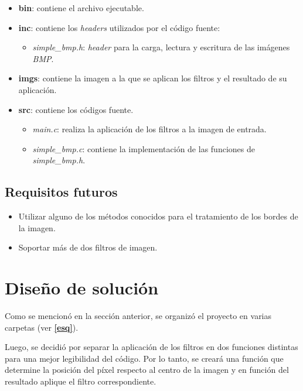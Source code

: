 \documentclass[12pt,a4paper]{article}
\begin{document}
\begin{itemize}[leftmargin=1.5cm]
  \item \textbf{bin}: contiene el archivo ejecutable.
  \item \textbf{inc}: contiene los \emph{headers} utilizados por el
  código fuente:

  \begin{itemize}[leftmargin=1cm, nosep]
    \item \emph{simple\_bmp.h}: \emph{header} para la carga, lectura y
    escritura de las imágenes \emph{BMP}.
  \end{itemize}

  \item \textbf{imgs}: contiene la imagen a la que se aplican los filtros y
  el resultado de su aplicación.
  \item \textbf{src}: contiene los códigos fuente.

  \begin{itemize}[leftmargin=1cm, nosep]
    \item \emph{main.c}: realiza la aplicación de los filtros a la imagen de
    entrada.
    \item \emph{simple\_bmp.c}: contiene la implementación de las funciones de
    \emph{simple\_bmp.h}.
  \end{itemize}
\end{itemize}

\subsection{Requisitos futuros}
\label{futurereq}

\begin{itemize}[leftmargin=1.5cm]
  \item Utilizar alguno de los métodos conocidos para el tratamiento de los
  bordes de la imagen.
  \item Soportar más de dos filtros de imagen.
\end{itemize}


\section{Diseño de solución}
\label{solucion}
Como se mencionó en la sección anterior, se organizó el proyecto en varias
carpetas (ver \textbf{\ref{esq}}).

Luego, se decidió por separar la aplicación de los filtros en dos funciones
distintas para una mejor legibilidad del código.
Por lo tanto, se creará una función que determine la posición del píxel
respecto al centro de la imagen y en función del resultado aplique el filtro
correspondiente.
\end{document}
